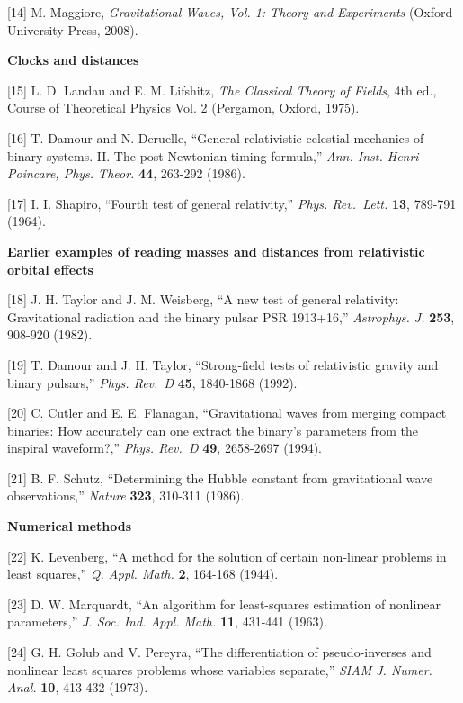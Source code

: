 \documentclass[
  a4paper,
]{article}
\begin{document}
{[}14{]} M. Maggiore, \emph{Gravitational Waves, Vol. 1: Theory and
Experiments} (Oxford University Press, 2008).

\textbf{Clocks and distances}

{[}15{]} L. D. Landau and E. M. Lifshitz, \emph{The Classical Theory of
Fields}, 4th ed., Course of Theoretical Physics Vol. 2 (Pergamon,
Oxford, 1975).

{[}16{]} T. Damour and N. Deruelle, ``General relativistic celestial
mechanics of binary systems. II. The post-Newtonian timing formula,''
\emph{Ann. Inst. Henri Poincare, Phys. Theor.} \textbf{44}, 263-292
(1986).

{[}17{]} I. I. Shapiro, ``Fourth test of general relativity,''
\emph{Phys. Rev.~Lett.} \textbf{13}, 789-791 (1964).

\textbf{Earlier examples of reading masses and distances from
relativistic orbital effects}

{[}18{]} J. H. Taylor and J. M. Weisberg, ``A new test of general
relativity: Gravitational radiation and the binary pulsar PSR 1913+16,''
\emph{Astrophys. J.} \textbf{253}, 908-920 (1982).

{[}19{]} T. Damour and J. H. Taylor, ``Strong-field tests of
relativistic gravity and binary pulsars,'' \emph{Phys. Rev.~D}
\textbf{45}, 1840-1868 (1992).

{[}20{]} C. Cutler and E. E. Flanagan, ``Gravitational waves from
merging compact binaries: How accurately can one extract the binary's
parameters from the inspiral waveform?,'' \emph{Phys. Rev.~D}
\textbf{49}, 2658-2697 (1994).

{[}21{]} B. F. Schutz, ``Determining the Hubble constant from
gravitational wave observations,'' \emph{Nature} \textbf{323}, 310-311
(1986).

\textbf{Numerical methods}

{[}22{]} K. Levenberg, ``A method for the solution of certain non-linear
problems in least squares,'' \emph{Q. Appl. Math.} \textbf{2}, 164-168
(1944).

{[}23{]} D. W. Marquardt, ``An algorithm for least-squares estimation of
nonlinear parameters,'' \emph{J. Soc. Ind. Appl. Math.} \textbf{11},
431-441 (1963).

{[}24{]} G. H. Golub and V. Pereyra, ``The differentiation of
pseudo-inverses and nonlinear least squares problems whose variables
separate,'' \emph{SIAM J. Numer. Anal.} \textbf{10}, 413-432 (1973).
\end{document}
